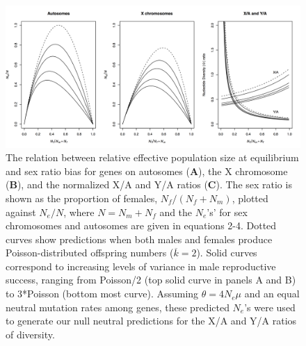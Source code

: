 \documentclass[9pt,twocolumn,twoside]{gsajnl}
\begin{document}







\begin{figure}[htbp]
\centering
\noindent
\includegraphics[width=\linewidth]{figure1.jpg}
\caption{The relation between relative effective population size at equilibrium and sex ratio bias for genes on autosomes (\textbf{A}), the X chromosome (\textbf{B}), and the normalized X/A and Y/A ratios (\textbf{C}). The sex ratio is shown as the proportion of females, $N_{f}/(N_{f}+N_{m})$, plotted against $N_{e}/N$, where $N=N_{m}+N_{f}$ and the $N_{e}$'s' for sex chromosomes and autosomes are given in equations 2-4. Dotted curves show predictions when both males and females produce Poisson-distributed offspring numbers ($\overline{k}=2$). Solid curves correspond to increasing levels of variance in male reproductive success, ranging from Poisson/2 (top solid curve in panels A and B) to 3*Poisson (bottom most curve). Assuming $\theta=4N_{e}\mu$ and an equal neutral mutation rates among genes, these predicted $N_{e}$'s were used to generate our null neutral predictions for the X/A and Y/A ratios of diversity.
}
\label{fig:spectrum}
\end{figure}
\end{document}
